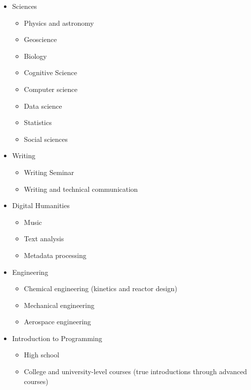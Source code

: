 \documentclass[]{book}
\providecommand{\tightlist}{%
  \setlength{\itemsep}{0pt}\setlength{\parskip}{0pt}}
\begin{document}
\begin{itemize}
\tightlist
\item
  Sciences

  \begin{itemize}
  \tightlist
  \item
    Physics and astronomy
  \item
    Geoscience
  \item
    Biology
  \item
    Cognitive Science
  \item
    Computer science
  \item
    Data science
  \item
    Statistics
  \item
    Social sciences
  \end{itemize}
\item
  Writing

  \begin{itemize}
  \tightlist
  \item
    Writing Seminar
  \item
    Writing and technical communication
  \end{itemize}
\item
  Digital Humanities

  \begin{itemize}
  \tightlist
  \item
    Music
  \item
    Text analysis
  \item
    Metadata processing
  \end{itemize}
\item
  Engineering

  \begin{itemize}
  \tightlist
  \item
    Chemical engineering (kinetics and reactor design)
  \item
    Mechanical engineering
  \item
    Aerospace engineering
  \end{itemize}
\item
  Introduction to Programming

  \begin{itemize}
  \tightlist
  \item
    High school
  \item
    College and university-level courses (true introductions through
    advanced courses)
  \end{itemize}
\end{itemize}
\end{document}
